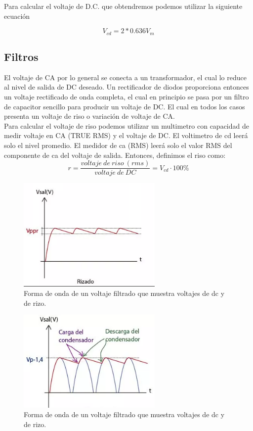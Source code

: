 Para calcular el voltaje de D.C. que obtendremos podemos utilizar la siguiente ecuación\cite{rectificador}


\begin{equation}\label{eq:ej}
V_{cd}=2*0.636V_{m}
\end{equation}


\subsection{Filtros}
El voltaje de CA por lo general se conecta a un transformador, el cual lo reduce al nivel de salida de DC deseado. Un rectificador de diodos proporciona entonces un voltaje rectificado de onda completa, el cual en principio se pasa por un filtro de capacitor sencillo para producir un voltaje de DC. El cual en todos los casos presenta un voltaje de riso o variación de voltaje de CA.\\

Para calcular el voltaje de riso podemos utilizar un multimetro con capacidad de medir voltaje en CA (TRUE RMS) y el voltaje de DC. El voltimetro de cd leerá solo el nivel promedio. El medidor de ca (RMS) leerá solo el valor RMS del componente de ca del voltaje de salida. Entonces, definimos el riso como:\\

\begin{equation}
r=\frac{voltaje\:  de\:  riso\:  (rms)}{voltaje\:  de\:  DC}=V_{cd}\cdot 100\%
\end{equation}

\begin{figure}[H]
\centering
\includegraphics[width=7cm]{capitulo3/figs/risado.png}
\caption{ Forma de onda de un voltaje filtrado que muestra voltajes de dc y de rizo.}
\end{figure}

\begin{figure}[H]
\centering
\includegraphics[width=7cm]{capitulo3/figs/filtro.png}
\caption{ Forma de onda de un voltaje filtrado que muestra voltajes de dc y de rizo.}
\end{figure}


